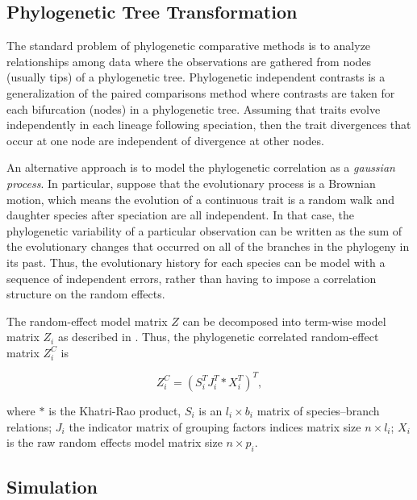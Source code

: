 \subsection{Phylogenetic Tree Transformation}
The standard problem of phylogenetic comparative methods is to analyze relationships among data where the observations are gathered from nodes (usually tips) of a phylogenetic tree.
Phylogenetic independent contrasts is a generalization of the paired comparisons method where contrasts are taken for each bifurcation (nodes) in a phylogenetic tree. 
Assuming that traits evolve independently in each lineage following speciation, then the trait divergences that occur at one node are independent of divergence at other nodes.  

An alternative approach is to model the phylogenetic correlation as a \textit{gaussian process}. 
In particular, suppose that the evolutionary process is a Brownian motion, which means the evolution of a continuous trait is a random walk and daughter species after speciation are all independent.  
In that case, the phylogenetic variability of a particular observation can be written as the sum of the evolutionary changes that occurred on all of the branches in the phylogeny in its past. 
Thus, the evolutionary history for each species can be model with a sequence of independent errors, rather than having to impose a correlation structure on the random effects. 

The random-effect model matrix $Z$ can be decomposed into term-wise model matrix $Z_{i}$ as described in .
Thus, the phylogenetic correlated random-effect matrix $Z^{C}_{i}$ is

\begin{equation}
Z^{C}_{i} = (S^{T}_{i}J^{T}_{i} \ast X^{T}_{i})^{T},
\end{equation}


where $\ast$ is the Khatri-Rao product, $S_{i}$ is an $l_{i} \times b_{i}$ matrix of species--branch relations; $J_{i}$ the indicator matrix of grouping factors indices matrix size $n \times l_{i}$; $X_{i}$ is the raw random effects model matrix size $n \times p_{i}$.



\subsection{Simulation}

